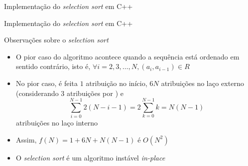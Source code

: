 \begin{frame}[fragile]{Implementação do \textit{selection sort} em C++}
\end{frame}

\begin{frame}[fragile]{Implementação do \textit{selection sort} em C++}
\end{frame}

\begin{frame}[fragile]{Observações sobre o \textit{selection sort}}

    \begin{itemize}
        \item O pior caso do algoritmo acontece quando a sequência está ordenado em sentido 
            contrário, isto é, $\forall i = 2, 3, \ldots, N, (a_i, a_{i - 1})\in R$

        \item No pior caso, é feita $1$ atribuição no início, $6N$ atribuições no laço externo 
            (considerando 3 atribuições por ) e
            \[
                \sum_{i = 0}^{N - 1} 2(N - i - 1) = 2\sum_{k = 0}^{N - 1} k = N(N - 1)
            \]
            atribuições no laço interno

        \item Assim, $f(N) = 1 + 6N + N(N - 1)$ é $O(N^2)$

        \item O \textit{selection sort} é um algoritmo instável \textit{in-place}
    \end{itemize}

\end{frame}
